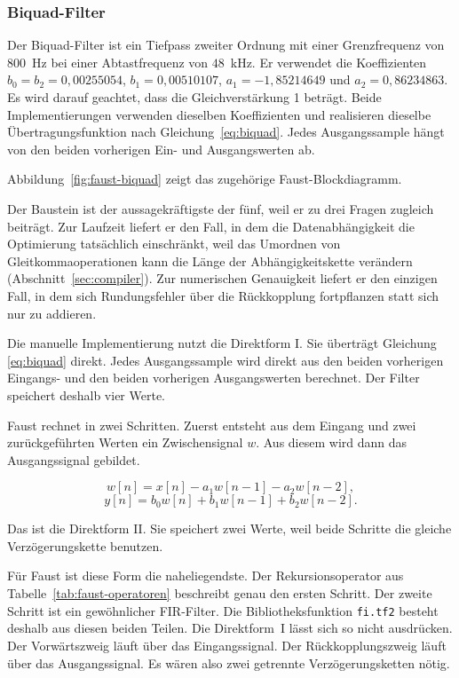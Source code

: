 \subsubsection*{Biquad-Filter}

Der Biquad-Filter ist ein Tiefpass zweiter Ordnung mit einer Grenzfrequenz von
$800$~Hz bei einer Abtastfrequenz von $48$~kHz. Er verwendet die
Koeffizienten $b_0 = b_2 = 0{,}00255054$, $b_1 = 0{,}00510107$,
$a_1 = -1{,}85214649$ und $a_2 = 0{,}86234863$. Es wird darauf geachtet, dass die Gleichverstärkung 1 beträgt. Beide Implementierungen verwenden dieselben Koeffizienten und
realisieren dieselbe Übertragungsfunktion nach
Gleichung~\ref{eq:biquad}. Jedes Ausgangssample hängt von den beiden
vorherigen Ein- und Ausgangswerten ab.

Abbildung~\ref{fig:faust-biquad} zeigt das zugehörige Faust-Blockdiagramm.



Der Baustein ist der aussagekräftigste der fünf, weil er zu drei Fragen
zugleich beiträgt. Zur Laufzeit liefert er den Fall, in dem die
Datenabhängigkeit die Optimierung tatsächlich einschränkt, weil das
Umordnen von Gleitkommaoperationen kann die Länge der Abhängigkeitskette verändern (Abschnitt~\ref{sec:compiler}). Zur numerischen Genauigkeit liefert er
den einzigen Fall, in dem sich Rundungsfehler über die Rückkopplung
fortpflanzen statt sich nur zu addieren.

Die manuelle Implementierung nutzt die Direktform I. Sie überträgt Gleichung \ref{eq:biquad} direkt. Jedes Ausgangssample wird direkt aus den beiden vorherigen Eingangs- und den beiden vorherigen Ausgangswerten berechnet. Der Filter speichert deshalb vier Werte.

Faust rechnet in zwei Schritten. Zuerst entsteht aus dem Eingang und zwei zurückgeführten Werten ein Zwischensignal $w$. Aus diesem wird dann das Ausgangssignal gebildet.

\begin{equation}
	w[n] = x[n] - a_1 w[n-1] - a_2 w[n-2],
	\label{eq:biquad-df2-rek}
\end{equation}
\begin{equation}
	y[n] = b_0 w[n] + b_1 w[n-1] + b_2 w[n-2].
	\label{eq:biquad-df2-fir}
\end{equation}

Das ist die Direktform II. Sie speichert zwei Werte, weil beide Schritte die gleiche Verzögerungskette benutzen.

Für Faust ist diese Form die naheliegendste. Der Rekursionsoperator aus Tabelle~\ref{tab:faust-operatoren} beschreibt genau den ersten Schritt. Der zweite Schritt ist ein gewöhnlicher FIR-Filter. Die Bibliotheksfunktion \texttt{fi.tf2} besteht deshalb aus diesen beiden Teilen. Die Direktform~I lässt sich so nicht ausdrücken. Der Vorwärtszweig läuft über das Eingangssignal. Der Rückkopplungszweig läuft über das Ausgangssignal. Es wären also zwei getrennte Verzögerungsketten nötig.


